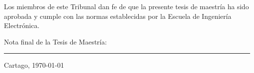 \vfill

Los miembros de este Tribunal dan fe de que la presente tesis de
maestría ha sido aprobada y cumple con las normas establecidas por la
Escuela de Ingeniería Electrónica.

\vfill

\begin{center}
  Nota final de la Tesis de Maestría: \rule{3cm}{0.5pt}
\end{center}
\vfill

\begin{center}
  Cartago, \today\par
\end{center}

\cleardoublepage

